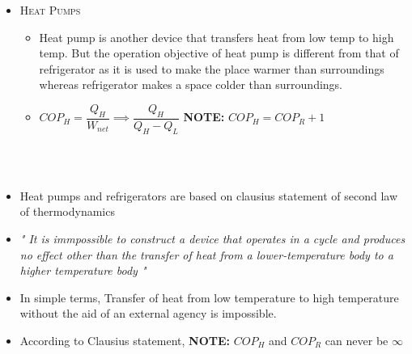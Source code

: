 \documentclass[8pt]{article}
\begin{document}
\begin{itemize}[wide]
\begin{itemize}
					\item \textsc{Heat Pumps}
						\begin{itemize}[wide]
							\item Heat pump is another device that transfers heat from low temp to high temp. But the operation objective of heat pump is different from that of refrigerator as it is used to make the place warmer than surroundings whereas refrigerator makes a space colder than surroundings. 
							\item $\boxed{COP_H = \dfrac{Q_H}{W_{net}} \implies \dfrac{Q_H}{Q_H-Q_L}}$ \textbf{NOTE:} $\boxed{COP_H=COP_R+1}$
						\end{itemize}
					\end{itemize}
				\end{itemize}		 
			\hrulefill\\
\\
			\begin{itemize}
				\item Heat pumps and refrigerators are based on clausius statement of second law of thermodynamics
				\item \textit{" It is immpossible to construct a device that operates in a cycle and produces no effect other than the transfer of heat from a lower-temperature body to a higher temperature body "}
				\item In simple terms, Transfer of heat from low temperature to high temperature without the aid of an external agency is impossible. 
				\item According to Clausius statement, \textbf{NOTE:} $COP_H$ and $COP_R$ can never be $\infty$	
			\end{itemize}				
	\hrulefill\\
\\
\end{document}
